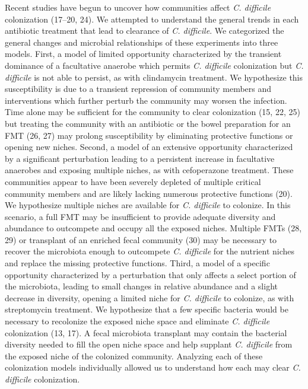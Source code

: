 \documentclass[11pt,]{article}
\begin{document}
Recent studies have begun to uncover how communities affect \emph{C.
difficile} colonization (17--20, 24). We attempted to understand the
general trends in each antibiotic treatment that lead to clearance of
\emph{C. difficile}. We categorized the general changes and microbial
relationships of these experiments into three models. First, a model of
limited opportunity characterized by the transient dominance of a
facultative anaerobe which permits \emph{C. difficile} colonization but
\emph{C. difficile} is not able to persist, as with clindamycin
treatment. We hypothesize this susceptibility is due to a transient
repression of community members and interventions which further perturb
the community may worsen the infection. Time alone may be sufficient for
the community to clear colonization (15, 22, 25) but treating the
community with an antibiotic or the bowel preparation for an FMT (26,
27) may prolong susceptibility by eliminating protective functions or
opening new niches. Second, a model of an extensive opportunity
characterized by a significant perturbation leading to a persistent
increase in facultative anaerobes and exposing multiple niches, as with
cefoperazone treatment. These communities appear to have been severely
depleted of multiple critical community members and are likely lacking
numerous protective functions (20). We hypothesize multiple niches are
available for \emph{C. difficile} to colonize. In this scenario, a full
FMT may be insufficient to provide adequate diversity and abundance to
outcompete and occupy all the exposed niches. Multiple FMTs (28, 29) or
transplant of an enriched fecal community (30) may be necessary to
recover the microbiota enough to outcompete \emph{C. difficile} for the
nutrient niches and replace the missing protective functions. Third, a
model of a specific opportunity characterized by a perturbation that
only affects a select portion of the microbiota, leading to small
changes in relative abundance and a slight decrease in diversity,
opening a limited niche for \emph{C. difficile} to colonize, as with
streptomycin treatment. We hypothesize that a few specific bacteria
would be necessary to recolonize the exposed niche space and eliminate
\emph{C. difficile} colonization (13, 17). A fecal microbiota transplant
may contain the bacterial diversity needed to fill the open niche space
and help supplant \emph{C. difficile} from the exposed niche of the
colonized community. Analyzing each of these colonization models
individually allowed us to understand how each may clear \emph{C.
difficile} colonization.
\end{document}

